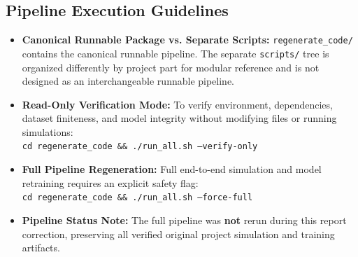 \documentclass[11pt,a4paper]{article}
\numberwithin{table}{section}
\numberwithin{figure}{section}
\begin{document}
\begin{table}[H]
\centering
\caption{Deliverables and Directory Organization}
\label{tab:map}
\end{table}

\subsection{Pipeline Execution Guidelines}
\begin{itemize}[noitemsep]
    \item \textbf{Canonical Runnable Package vs. Separate Scripts:} \texttt{regenerate\_code/} contains the canonical runnable pipeline. The separate \texttt{scripts/} tree is organized differently by project part for modular reference and is not designed as an interchangeable runnable pipeline.
    \item \textbf{Read-Only Verification Mode:} To verify environment, dependencies, dataset finiteness, and model integrity without modifying files or running simulations:\\[0.3em]
    \hspace*{2em}\texttt{cd regenerate\_code \&\& ./run\_all.sh --verify-only}
    \item \textbf{Full Pipeline Regeneration:} Full end-to-end simulation and model retraining requires an explicit safety flag:\\[0.3em]
    \hspace*{2em}\texttt{cd regenerate\_code \&\& ./run\_all.sh --force-full}
    \item \textbf{Pipeline Status Note:} The full pipeline was \textbf{not} rerun during this report correction, preserving all verified original project simulation and training artifacts.
\end{itemize}
\end{document}
